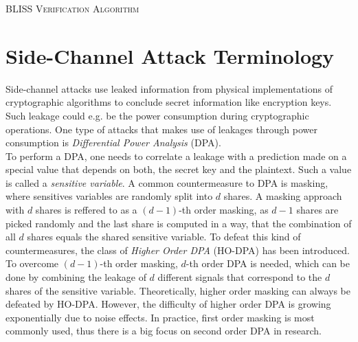 \begin{algorithm}
    \caption{\textsc{BLISS Verification Algorithm}}
    \begin{algorithmic}[1]
    	\EndIf
    	\EndIf
    \end{algorithmic}
\end{algorithm}

\section{Side-Channel Attack Terminology}
Side-channel attacks use leaked information from physical implementations of cryptographic algorithms to conclude secret information like encryption keys. Such leakage could e.g. be the power consumption during cryptographic operations. One type of attacks that makes use of leakages through power consumption is \textit{Differential Power Analysis} (DPA).\\
To perform a DPA, one needs to correlate a leakage with a prediction made on a special value that depends on both, the secret key and the plaintext. Such a value is called a \textit{sensitive variable}. A common countermeasure to DPA is masking, where sensitives variables are randomly split into \(d\) shares. A masking approach with \(d\) shares is reffered to as a \((d-1)\)-th order masking, as \(d-1\) shares are picked randomly and the last share is computed in a way, that the combination of all \(d\) shares equals the shared sensitive variable. To defeat this kind of countermeasures, the class of \textit{Higher Order DPA} (HO-DPA) has been introduced. To overcome \((d-1)\)-th order masking, \(d\)-th order DPA is needed, which can be done by combining the leakage of \(d\) different signals that correspond to the \(d\) shares of the sensitive variable. Theoretically, higher order masking can always be defeated by HO-DPA. However, the difficulty of higher order DPA is growing exponentially due to noise effects. In practice, first order masking is most commonly used, thus there is a big focus on second order DPA in research.